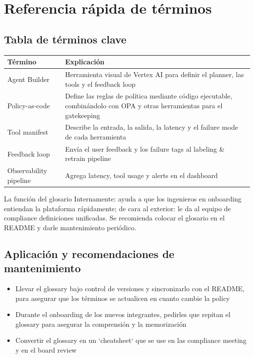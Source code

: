 \section{Referencia rápida de términos}

\subsection{Tabla de términos clave}

\begin{tabular}{p{} p{}}
\toprule
Término & Explicación \\
\midrule
Agent Builder & Herramienta visual de Vertex AI para definir el planner, las tools y el feedback loop \\
Policy-as-code & Define las reglas de política mediante código ejecutable, combinándolo con OPA y otras herramientas para el gatekeeping \\
Tool manifest & Describe la entrada, la salida, la latency y el failure mode de cada herramienta \\
Feedback loop & Envía el user feedback y los failure tags al labeling \& retrain pipeline \\
Observability pipeline & Agrega latency, tool usage y alerts en el dashboard \\
\bottomrule
\end{tabular}

\begin{importantbox}{La función del glosario}
Internamente: ayuda a que los ingenieros en onboarding entiendan la plataforma rápidamente; de cara al exterior: le da al equipo de compliance definiciones unificadas. Se recomienda colocar el glosario en el README y darle mantenimiento periódico.
\end{importantbox}

\subsection{Aplicación y recomendaciones de mantenimiento}

\begin{itemize}
    \item Llevar el glossary bajo control de versiones y sincronizarlo con el README, para asegurar que los términos se actualicen en cuanto cambie la policy
    \item Durante el onboarding de los nuevos integrantes, pedirles que repitan el glossary para asegurar la comprensión y la memorización
    \item Convertir el glossary en un `cheatsheet` que se use en las compliance meeting y en el board review
\end{itemize}

